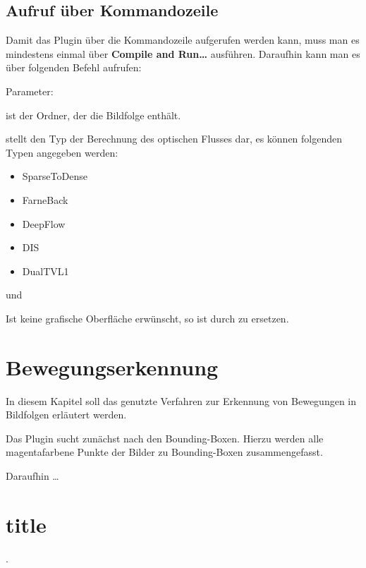 \section{Aufruf über Kommandozeile}

Damit das Plugin über die Kommandozeile aufgerufen werden kann, muss man es mindestens einmal über \textbf{Compile and Run\dots} ausführen. Daraufhin kann man es über folgenden Befehl aufrufen:



Parameter:

 ist der Ordner, der die Bildfolge enthält.

 stellt den Typ der Berechnung des optischen Flusses dar, es können folgenden Typen angegeben werden:

\begin{itemize}
\item SparseToDense
\item FarneBack
\item DeepFlow
\item DIS
\item DualTVL1
\end{itemize}

 und 

Ist keine grafische Oberfläche erwünscht, so ist  durch  zu ersetzen.


\chapter{Bewegungserkennung}

In diesem Kapitel soll das genutzte Verfahren zur Erkennung von Bewegungen in Bildfolgen erläutert werden.

Das Plugin sucht zunächst nach den Bounding-Boxen. Hierzu werden alle magentafarbene Punkte der Bilder zu Bounding-Boxen zusammengefasst.

Daraufhin \dots

\chapter{title}.